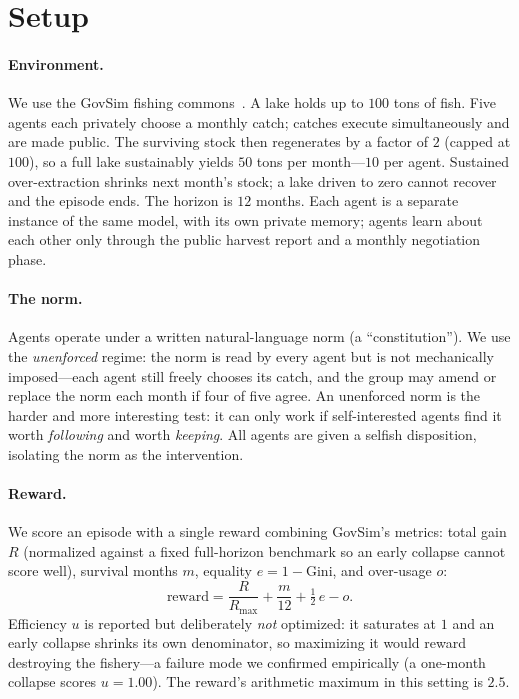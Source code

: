 \documentclass[11pt]{article}
\begin{document}
\section{Setup}

\paragraph{Environment.}
We use the GovSim fishing commons~\citep{govsim}. A lake holds up to $100$ tons of
fish. Five agents each privately choose a monthly catch; catches execute
simultaneously and are made public. The surviving stock then regenerates by a
factor of $2$ (capped at $100$), so a full lake sustainably yields $50$ tons per
month---$10$ per agent. Sustained over-extraction shrinks next month's stock; a
lake driven to zero cannot recover and the episode ends. The horizon is $12$
months. Each agent is a separate instance of the same model, with its own private
memory; agents learn about each other only through the public harvest report and a
monthly negotiation phase.

\paragraph{The norm.}
Agents operate under a written natural-language norm (a ``constitution''). We use
the \emph{unenforced} regime: the norm is read by every agent but is not
mechanically imposed---each agent still freely chooses its catch, and the group may
amend or replace the norm each month if four of five agree. An unenforced norm is
the harder and more interesting test: it can only work if self-interested agents
find it worth \emph{following} and worth \emph{keeping}. All agents are given a
selfish disposition, isolating the norm as the intervention.

\paragraph{Reward.}
We score an episode with a single reward combining GovSim's metrics: total gain
$R$ (normalized against a fixed full-horizon benchmark so an early collapse cannot
score well), survival months $m$, equality $e = 1 - \text{Gini}$, and over-usage
$o$:
\[
  \text{reward} = \frac{R}{R_{\max}} + \frac{m}{12} + \tfrac{1}{2}\,e - o .
\]
Efficiency $u$ is reported but deliberately \emph{not} optimized: it saturates at
$1$ and an early collapse shrinks its own denominator, so maximizing it would
reward destroying the fishery---a failure mode we confirmed empirically (a
one-month collapse scores $u=1.00$). The reward's arithmetic maximum in this
setting is $2.5$.
\end{document}
